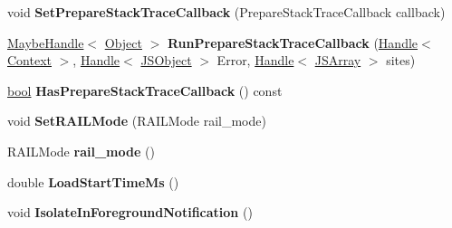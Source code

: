 \begin{DoxyCompactItemize}
\item 
\mbox{\label{classv8_1_1internal_1_1Isolate_ad843a7893ffb675a433e50434fa51dab}} 
void {\bfseries Set\+Prepare\+Stack\+Trace\+Callback} (Prepare\+Stack\+Trace\+Callback callback)
\item 
\mbox{\label{classv8_1_1internal_1_1Isolate_a78eb52e035e480f2fec994170c511052}} 
\mbox{\hyperlink{classv8_1_1internal_1_1MaybeHandle}{Maybe\+Handle}}$<$ \mbox{\hyperlink{classv8_1_1internal_1_1Object}{Object}} $>$ {\bfseries Run\+Prepare\+Stack\+Trace\+Callback} (\mbox{\hyperlink{classv8_1_1internal_1_1Handle}{Handle}}$<$ \mbox{\hyperlink{classv8_1_1internal_1_1Context}{Context}} $>$, \mbox{\hyperlink{classv8_1_1internal_1_1Handle}{Handle}}$<$ \mbox{\hyperlink{classv8_1_1internal_1_1JSObject}{J\+S\+Object}} $>$ Error, \mbox{\hyperlink{classv8_1_1internal_1_1Handle}{Handle}}$<$ \mbox{\hyperlink{classv8_1_1internal_1_1JSArray}{J\+S\+Array}} $>$ sites)
\item 
\mbox{\label{classv8_1_1internal_1_1Isolate_a32bf7f022b53a5ade2a7ba693a9492fa}} 
\mbox{\hyperlink{classbool}{bool}} {\bfseries Has\+Prepare\+Stack\+Trace\+Callback} () const
\item 
\mbox{\label{classv8_1_1internal_1_1Isolate_a5dfd9fcfd2e9d08f50a297aa3a0f9763}} 
void {\bfseries Set\+R\+A\+I\+L\+Mode} (R\+A\+I\+L\+Mode rail\+\_\+mode)
\item 
\mbox{\label{classv8_1_1internal_1_1Isolate_a91482925806fce0a7f2af254a89b0ee0}} 
R\+A\+I\+L\+Mode {\bfseries rail\+\_\+mode} ()
\item 
\mbox{\label{classv8_1_1internal_1_1Isolate_ab00e4a00dda80424f25b337b6f820553}} 
double {\bfseries Load\+Start\+Time\+Ms} ()
\item 
\mbox{\label{classv8_1_1internal_1_1Isolate_a805c8bdc40bb6462f03af58563c89d93}} 
void {\bfseries Isolate\+In\+Foreground\+Notification} ()
\item 
\mbox{\label{classv8_1_1internal_1_1Isolate_a382f7c9e3d2ac1392a3ae37de9897faf}} 

\end{DoxyCompactItemize}
